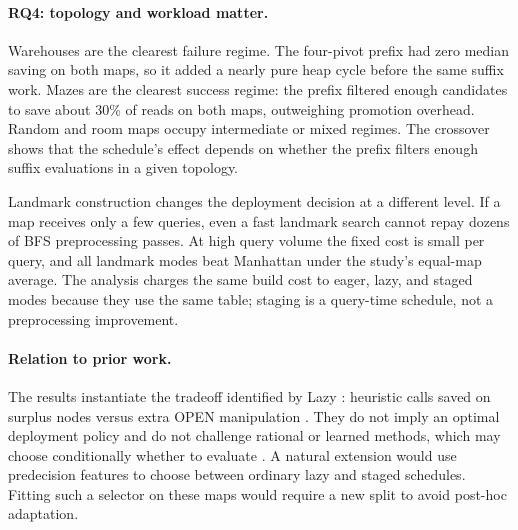 \paragraph{RQ4: topology and workload matter.}
Warehouses are the clearest failure regime.  The four-pivot prefix had zero
median saving on both maps, so it added a nearly pure heap cycle before the
same suffix work.  Mazes are the clearest success regime: the prefix filtered
enough candidates to save about 30\% of reads on both maps, outweighing
promotion overhead.  Random and room maps occupy intermediate or mixed
regimes.  The crossover shows that the schedule's effect depends on whether
the prefix filters enough suffix evaluations in a given topology.

Landmark construction changes the deployment decision at a different level.
If a map receives only a few queries, even a fast landmark search cannot repay
dozens of BFS preprocessing passes.  At high query volume the fixed cost is
small per query, and all landmark modes beat Manhattan under the study's
equal-map average.  The analysis charges the same build cost to
eager, lazy, and staged modes because they use the same table; staging is a
query-time schedule, not a preprocessing improvement.

\paragraph{Relation to prior work.}
The results instantiate the tradeoff identified by Lazy \Astar{}: heuristic
calls saved on surplus nodes versus extra OPEN manipulation
\citep{tolpin2013towards}.  They do not imply an optimal deployment policy and
do not challenge rational or learned methods, which may choose conditionally
whether to evaluate \citep{karpas2018rational,domshlak2012online}.  A natural
extension would use predecision features to choose between ordinary lazy and
staged schedules.  Fitting such a selector on these maps would require a new
split to avoid post-hoc adaptation.
